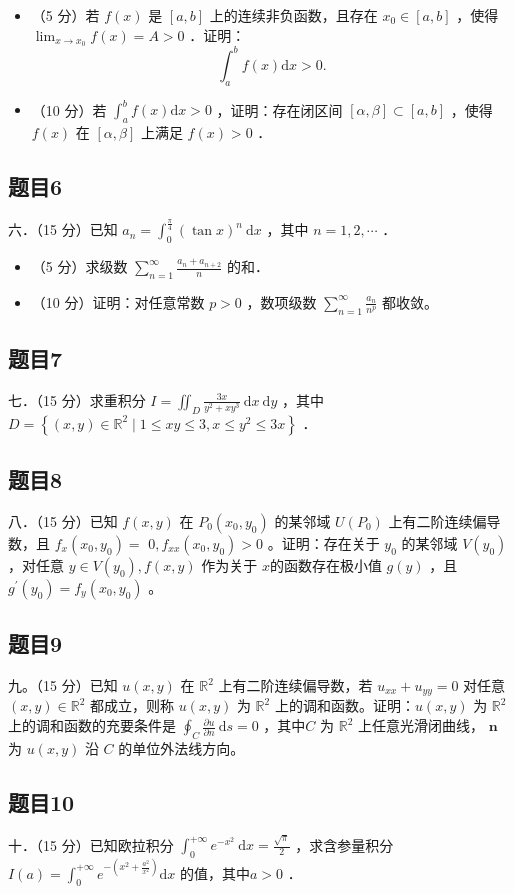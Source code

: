 \documentclass{article}
\begin{document}
\begin{itemize}
  \item[（1）] （5 分）若 \(f(x)\) 是 \([a, b]\) 上的连续非负函数，且存在 \(x_{0} \in[a, b]\) ，使得 \(\lim _{x \rightarrow x_{0}} f(x)=A>0\) ．证明：
\[
\int_{a}^{b} f(x) \mathrm{d} x>0 .
\]
  \item[（2）] （10 分）若 \(\int_{a}^{b} f(x) \mathrm{d} x>0\) ，证明：存在闭区间 \([\alpha, \beta] \subset[a, b]\) ，使得 \(f(x)\) 在 \([\alpha, \beta]\) 上满足 \(f(x)>0\) ．
\end{itemize}

\subsection{题目6}
六．（15 分）已知 \(a_{n}=\int_{0}^{\frac{\pi}{4}}(\tan x)^{n} \mathrm{~d} x\) ，其中 \(n=1,2, \cdots\) ．

\begin{itemize}
  \item[（1）] （5 分）求级数 \(\sum_{n=1}^{\infty} \frac{a_{n}+a_{n+2}}{n}\) 的和．
  \item[（2）] （10 分）证明：对任意常数 \(p>0\) ，数项级数 \(\sum_{n=1}^{\infty} \frac{a_{n}}{n^{p}}\) 都收敛。
\end{itemize}

\subsection{题目7}
七．（15 分）求重积分 \(I=\iint_{D} \frac{3 x}{y^{2}+x y^{3}} \mathrm{~d} x \mathrm{~d} y\) ，其中 \(D=\left\{(x, y) \in \mathbb{R}^{2} \mid 1 \leq x y \leq 3, x \leq y^{2} \leq 3 x\right\}\) ．

\subsection{题目8}
八．（15 分）已知 \(f(x, y)\) 在 \(P_{0}\left(x_{0}, y_{0}\right)\) 的某邻域 \(U\left(P_{0}\right)\) 上有二阶连续偏导数，且 \(f_{x}\left(x_{0}, y_{0}\right)=\) \(0, f_{x x}\left(x_{0}, y_{0}\right)>0\) 。证明：存在关于 \(y_{0}\) 的某邻域 \(V\left(y_{0}\right)\) ，对任意 \(y \in V\left(y_{0}\right), f(x, y)\) 作为关于 \(x\)的函数存在极小值 \(g(y)\) ，且 \(g^{\prime}\left(y_{0}\right)=f_{y}\left(x_{0}, y_{0}\right)\) 。

\subsection{题目9}
九。（15 分）已知 \(u(x, y)\) 在 \(\mathbb{R}^{2}\) 上有二阶连续偏导数，若 \(u_{x x}+u_{y y}=0\) 对任意 \((x, y) \in \mathbb{R}^{2}\) 都成立，则称 \(u(x, y)\) 为 \(\mathbb{R}^{2}\) 上的调和函数。证明：\(u(x, y)\) 为 \(\mathbb{R}^{2}\) 上的调和函数的充要条件是 \(\oint_{C} \frac{\partial u}{\partial n} \mathrm{~d} s=0\) ，其中\(C\) 为 \(\mathbb{R}^{2}\) 上任意光滑闭曲线， \(\mathbf{n}\) 为 \(u(x, y)\) 沿 \(C\) 的单位外法线方向。

\subsection{题目10}
十．（15 分）已知欧拉积分 \(\int_{0}^{+\infty} e^{-x^{2}} \mathrm{~d} x=\frac{\sqrt{\pi}}{2}\) ，求含参量积分 \(I(a)=\int_{0}^{+\infty} e^{-\left(x^{2}+\frac{a^{2}}{x^{2}}\right)} \mathrm{d} x\) 的值，其中\(a>0\) ．
\end{document}
